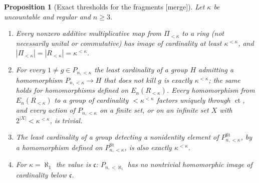 \documentclass[11pt,oneside]{article}
\numberwithin{equation}{section}
\newtheorem{proposition}[proposition]{Proposition}
\theoremstyle{definition}
\theoremstyle{remark}
\newcommand{\ct}{\operatorname{ct}}
\newcommand{\St}{\operatorname{St}}
\newcommand{\mergetag}{\textup{\textsf{\small[merge]}}}
\begin{document}
\begin{proposition}[Exact thresholds for the fragments \mergetag]\label{ogl:ker:prop:exact}
Let $\kappa$ be uncountable and regular and $n\ge3$.
\begin{enumerate}
\item Every nonzero additive multiplicative map from $\Pi_{<\kappa}$ to a ring
(not necessarily unital or commutative) has image of cardinality at least
$\kappa^{<\kappa}$, and $|\Pi_{<\kappa}|=|R_{<\kappa}|=\kappa^{<\kappa}$.
\item For every $1\ne g\in P_{n,<\kappa}$ the least cardinality of a group $H$
admitting a homomorphism $P_{n,<\kappa}\to H$ that does not kill $g$ is exactly
$\kappa^{<\kappa}$; the same holds for homomorphisms defined on
$E_n(R_{<\kappa})$. Every homomorphism from $E_n(R_{<\kappa})$ to a group of
cardinality $<\kappa^{<\kappa}$ factors uniquely through $\ct$, and every action
of $P_{n,<\kappa}$ on a finite set, or on an infinite set $X$ with
$2^{|X|}<\kappa^{<\kappa}$, is trivial.
\item The least cardinality of a group detecting a nonidentity element of
$P^{\St}_{n,<\kappa}$, by a homomorphism defined on $P^{\St}_{n,<\kappa}$, is also
exactly $\kappa^{<\kappa}$.
\item For $\kappa=\aleph_1$ the value is $\mathfrak c$: $P_{n,<\aleph_1}$ has no
nontrivial homomorphic image of cardinality below $\mathfrak c$.
\end{enumerate}
\end{proposition}
\end{document}
